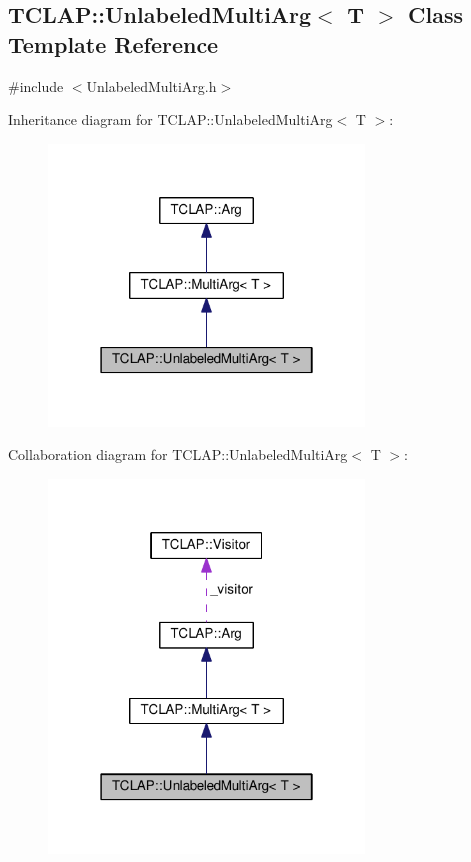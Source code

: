 \hypertarget{classTCLAP_1_1UnlabeledMultiArg}{}\subsection{T\+C\+L\+AP\+:\+:Unlabeled\+Multi\+Arg$<$ T $>$ Class Template Reference}
\label{classTCLAP_1_1UnlabeledMultiArg}


{\ttfamily \#include $<$Unlabeled\+Multi\+Arg.\+h$>$}



Inheritance diagram for T\+C\+L\+AP\+:\+:Unlabeled\+Multi\+Arg$<$ T $>$\+:
\nopagebreak
\begin{figure}[H]
\begin{center}
\leavevmode
\includegraphics[width=238pt]{classTCLAP_1_1UnlabeledMultiArg__inherit__graph}
\end{center}
\end{figure}


Collaboration diagram for T\+C\+L\+AP\+:\+:Unlabeled\+Multi\+Arg$<$ T $>$\+:
\nopagebreak
\begin{figure}[H]
\begin{center}
\leavevmode
\includegraphics[width=238pt]{classTCLAP_1_1UnlabeledMultiArg__coll__graph}
\end{center}
\end{figure}
